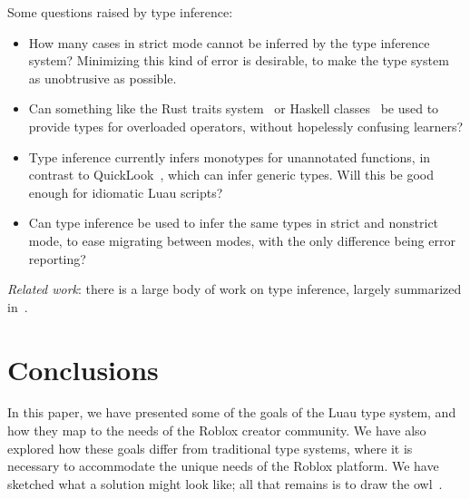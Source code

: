 \documentclass[acmsmall]{acmart}
\begin{document}
Some questions raised by type inference:
\begin{itemize}

\item How many cases in strict mode cannot be inferred by the type inference system? Minimizing
  this kind of error is desirable, to make the type system as unobtrusive as possible.
\item Can something like the Rust traits system~\cite{RustBook} or Haskell classes~\cite{TypeClasses} be used to provide types for overloaded operators, without hopelessly confusing learners?
\item Type inference currently infers monotypes for unannotated
  functions, in contrast to QuickLook~\cite{???}, which can infer generic types.
  Will this be good enough for idiomatic Luau scripts?
\item Can type inference be used to infer the same types in strict and nonstrict mode, to ease migrating between modes, with the only difference being error reporting?
\end{itemize}
\emph{Related work}: there is a large body of work on type inference, largely summarized in~\cite{TAPL}.

\section{Conclusions}

In this paper, we have presented some of the goals of the Luau type
system, and how they map to the needs of the Roblox creator
community. We have also explored how these goals differ from traditional
type systems, where it is necessary to accommodate the unique needs of
the Roblox platform. We have sketched what a solution might look like;
all that remains is to draw the owl~\cite{HowToDrawAnOwl}.

 
\end{document}
